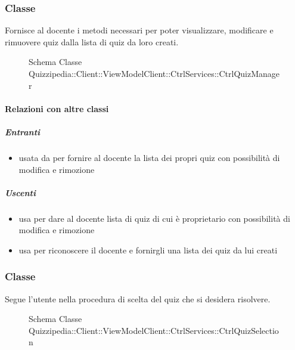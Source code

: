 \subsubsection{Classe }
Fornisce al docente i metodi necessari per poter visualizzare, modificare e rimuovere quiz dalla lista di quiz da loro creati.
\begin{figure}[H]
\centering
\noindent{}
\caption[Schema Classe CtrlQuizManager]{Schema Classe Quizzipedia::Client::ViewModelClient::CtrlServices::CtrlQuizManager}
\end{figure}
\paragraph{Relazioni con altre classi}
\subparagraph{Entranti}
\begin{itemize}
\item usata da  per fornire al docente la lista dei propri quiz con possibilità di modifica e rimozione
\end{itemize}
\subparagraph{Uscenti}
\begin{itemize}
\item usa  per dare al docente lista di quiz di cui è proprietario con possibilità di modifica e rimozione
\item usa  per riconoscere il docente e fornirgli una lista dei quiz da lui creati
\end{itemize}
\subsubsection{Classe }
Segue l'utente nella procedura di scelta del quiz che si desidera risolvere.
\begin{figure}[H]
\centering
\noindent{}
\caption[Schema Classe CtrlQuizSelection]{Schema Classe Quizzipedia::Client::ViewModelClient::CtrlServices::CtrlQuizSelection}
\end{figure}

